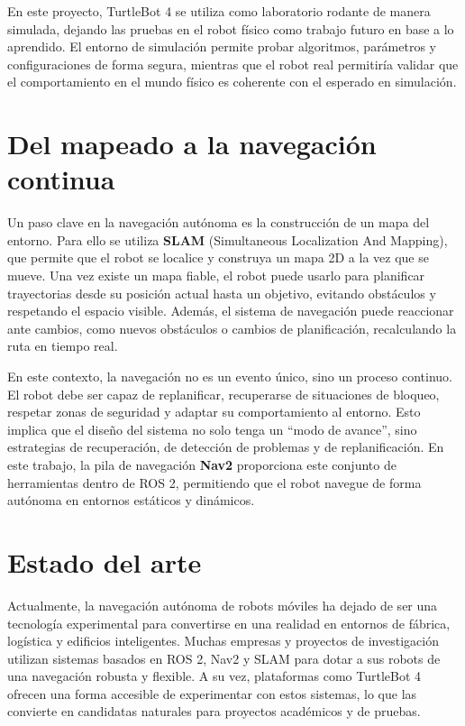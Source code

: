 En este proyecto, TurtleBot 4 se utiliza como laboratorio rodante de manera simulada, dejando las pruebas en el robot físico como trabajo futuro en base a lo aprendido. El entorno de simulación permite probar algoritmos, parámetros y configuraciones de forma segura, mientras que el robot real permitiría validar que el comportamiento en el mundo físico es coherente con el esperado en simulación.

\section{Del mapeado a la navegación continua}

Un paso clave en la navegación autónoma es la construcción de un mapa del entorno. Para ello se utiliza \textbf{SLAM} (Simultaneous Localization And Mapping), que permite que el robot se localice y construya un mapa 2D a la vez que se mueve. Una vez existe un mapa fiable, el robot puede usarlo para planificar trayectorias desde su posición actual hasta un objetivo, evitando obstáculos y respetando el espacio visible. Además, el sistema de navegación puede reaccionar ante cambios, como nuevos obstáculos o cambios de planificación, recalculando la ruta en tiempo real.

En este contexto, la navegación no es un evento único, sino un proceso continuo. El robot debe ser capaz de replanificar, recuperarse de situaciones de bloqueo, respetar zonas de seguridad y adaptar su comportamiento al entorno. Esto implica que el diseño del sistema no solo tenga un “modo de avance”, sino estrategias de recuperación, de detección de problemas y de replanificación. En este trabajo, la pila de navegación \textbf{Nav2} proporciona este conjunto de herramientas dentro de ROS 2, permitiendo que el robot navegue de forma autónoma en entornos estáticos y dinámicos.

\section{Estado del arte}

Actualmente, la navegación autónoma de robots móviles ha dejado de ser una tecnología experimental para convertirse en una realidad en entornos de fábrica, logística y edificios inteligentes. Muchas empresas y proyectos de investigación utilizan sistemas basados en ROS 2, Nav2 y SLAM para dotar a sus robots de una navegación robusta y flexible. A su vez, plataformas como TurtleBot 4 ofrecen una forma accesible de experimentar con estos sistemas, lo que las convierte en candidatas naturales para proyectos académicos y de pruebas.

